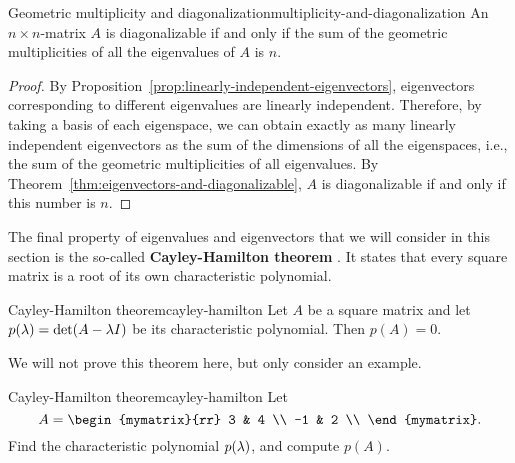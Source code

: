 \begin{proposition}{Geometric multiplicity and diagonalization}{multiplicity-and-diagonalization}
  An $n\times n$-matrix $A$ is diagonalizable if and only if the sum
  of the geometric multiplicities of all the eigenvalues of $A$ is
  $n$.
\end{proposition}

\begin{proof}
  By Proposition~\ref{prop:linearly-independent-eigenvectors},
  eigenvectors corresponding to different eigenvalues are linearly
  independent. Therefore, by taking a basis of each eigenspace, we can
  obtain exactly as many linearly independent eigenvectors as the sum
  of the dimensions of all the eigenspaces, i.e., the sum of the
  geometric multiplicities of all eigenvalues. By
  Theorem~\ref{thm:eigenvectors-and-diagonalizable}, $A$ is
  diagonalizable if and only if this number is $n$.
\end{proof}

The final property of eigenvalues and eigenvectors that we will
consider in this section is the so-called \textbf{Cayley-Hamilton
  theorem}%
%
%
. It states that every square
matrix is a root of its own characteristic polynomial.

\begin{theorem}{Cayley-Hamilton theorem}{cayley-hamilton}
  Let $A$ be a square matrix and let $p(\lambda)=\det(A-\lambda
  I)$ be its characteristic polynomial. Then $p(A)=0$.
\end{theorem}

We will not prove this theorem here, but only consider an example.

\begin{example}{Cayley-Hamilton theorem}{cayley-hamilton}
  Let
  \begin{equation*}
    A = \begin{mymatrix}{rr}
      3 & 4 \\
      -1 & 2 \\
    \end{mymatrix}.
  \end{equation*}
  Find the characteristic polynomial $p(\lambda)$, and compute
  $p(A)$.
\end{example}

